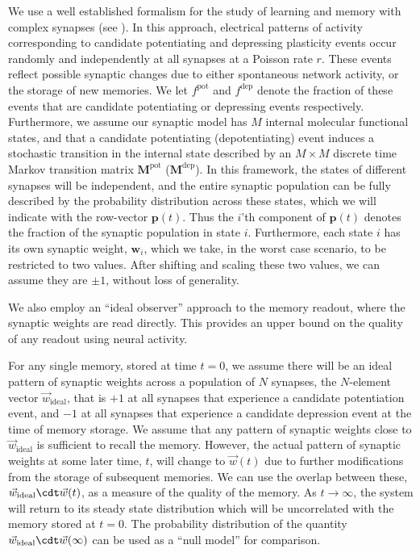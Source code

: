 \documentclass{article} %
\newcommand{\wv}{\vec{w}}
\newcommand{\wvi}{\vec{w}_\text{ideal}}
\newcommand{\pr}{\mathbf{p}}
\newcommand{\w}{\mathbf{w}}
\newcommand{\M}{\mathbf{M}}
\newcommand{\pot}{^{\text{pot}}}
\newcommand{\dep}{^{\text{dep}}}
\begin{document}
We use a well established formalism for the study of learning and memory with complex synapses (see \cite{Fusi2005cascade,Fusi2007multistate,Barrett2008discrete}).
In this approach, electrical patterns of activity corresponding to candidate potentiating and depressing plasticity events occur randomly and independently at all synapses at a Poisson rate $r$.  These events reflect possible synaptic changes due to either spontaneous network activity, or the storage of new memories.
We let  $f\pot$ and  $f\dep$ denote the fraction of these events that are candidate potentiating or depressing events respectively.
Furthermore, we assume our synaptic model has $M$ internal molecular functional states, and that a candidate potentiating (depotentiating) event induces a stochastic transition in the internal state described by an $M \times M$ discrete time Markov transition matrix  $\M\pot$ ($\M\dep$).
In this framework, the states of different synapses will be independent, and the entire synaptic population can be fully described by the probability distribution across these states, which we will indicate with the row-vector $\pr(t)$.
Thus the $i$'th component of $\pr(t)$ denotes the fraction of the synaptic population in state $i$.
Furthermore, each state $i$ has its own synaptic weight, $\w_i$, which we take, in the worst case scenario, to be restricted to two values.
After shifting and scaling these two values,  we can assume they are $\pm1$, without loss of generality.

We also employ an ``ideal observer'' approach to the memory readout, where the synaptic weights are read directly.
This provides an upper bound on the quality of any readout using neural activity.

For any single memory, stored at time $t=0$, we assume there will be an ideal pattern of synaptic weights across a population of $N$ synapses, the $N$-element vector $\wvi$, that is $+1$ at all synapses that experience a candidate potentiation event, and $-1$ at all synapses that experience a candidate depression event at the time of memory storage.
We assume that any pattern of synaptic weights close to $\wvi$ is sufficient to recall the memory.
However, the actual pattern of synaptic weights at some later time, $t$, will change to $\wv(t)$ due to further modifications from the storage of subsequent memories.
We can use the overlap between these, $\wvi\cdt\wv(t)$, as a measure of the quality of the memory.
As $t\to\infty$, the system will return to its steady state distribution which will be uncorrelated with the memory stored at $t=0$.
The probability distribution of the quantity $\wvi\cdt\wv(\infty)$ can be used as a ``null model'' for comparison.
\end{document}

